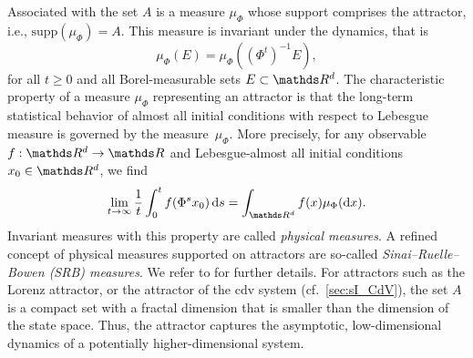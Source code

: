 Associated with the set $A$ is a measure $\mu_\Phi$ whose support comprises the attractor, i.e., $\text{supp}(\mu_\Phi) = A$. This measure is invariant under the dynamics, that is
\begin{equation}
    \mu_{\Phi}(E) = \mu_{\Phi}((\Phi^t)^{-1} E),
\end{equation}
for all $t\geq 0$ and all Borel-measurable sets $E \subset \R^d$. The characteristic property of a measure $\mu_\Phi$ representing an attractor is that the long-term statistical behavior of almost all initial conditions with respect to Lebesgue measure is governed by the measure~$\mu_{\Phi}$. %
More precisely, for any observable $f:\R^d \to \R$ and Lebesgue-almost all initial conditions $x_0\in \R^d$, we find
\begin{equation}\label{eq:Birkhoff}
    \lim_{t\to \infty} \frac{1}{t} \int_0^t f(\Phi^s x_0) \,\dd s = \int_{\R^d} f(x) \mu_{\Phi}(\dd x).
\end{equation}
Invariant measures with this property are called \emph{physical measures}. A refined concept of physical measures supported on attractors are so-called \emph{Sinai--Ruelle--Bowen (SRB) measures}. We refer to \textcite{youngWhatAreSRB2002} for further details. For attractors such as the Lorenz attractor, or the attractor of the \gls{cdv} system (cf.~\cref{sec:sI_CdV}), the set $A$ is a compact set with a fractal dimension that is smaller than the dimension of the state space. Thus, the attractor captures the asymptotic, low-dimensional dynamics of a potentially higher-dimensional system.

